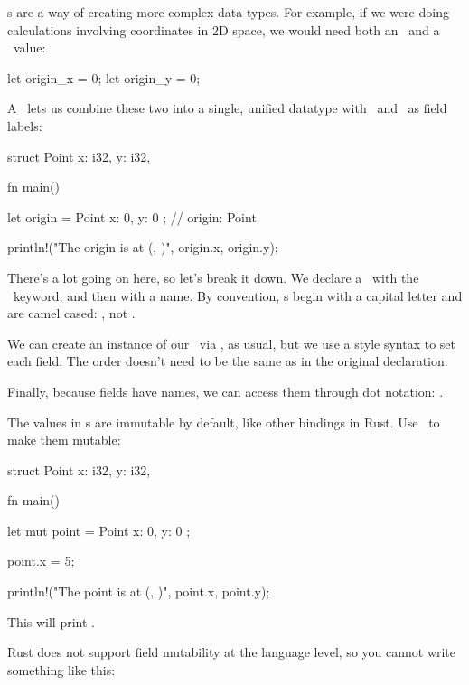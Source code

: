 \struct s are a way of creating more complex data types. For example, if we were doing calculations involving coordinates in 
2D space, we would need both an \x\ and a \y\ value:

\begin{rustc}
let origin_x = 0;
let origin_y = 0;
\end{rustc}

A \struct\ lets us combine these two into a single, unified datatype with \x\ and \y\ as field labels:

\begin{rustc}
struct Point {
    x: i32,
    y: i32,
}

fn main() {
    let origin = Point { x: 0, y: 0 }; // origin: Point

    println!("The origin is at ({}, {})", origin.x, origin.y);
}
\end{rustc}

There's a lot going on here, so let's break it down. We declare a \struct\ with the \struct\ keyword, and then with a name. By 
convention, \struct s begin with a capital letter and are camel cased: , not .

\blank

We can create an instance of our \struct\ via \keylet, as usual, but we use a  style syntax to set each field. The 
order doesn't need to be the same as in the original declaration.

\blank

Finally, because fields have names, we can access them through dot notation: .

\blank

The values in \struct s are immutable by default, like other bindings in Rust. Use \mut\ to make them mutable:

\begin{rustc}
struct Point {
    x: i32,
    y: i32,
}

fn main() {
    let mut point = Point { x: 0, y: 0 };

    point.x = 5;

    println!("The point is at ({}, {})", point.x, point.y);
}
\end{rustc}

This will print .

\blank

Rust does not support field mutability at the language level, so you cannot write something like this:

